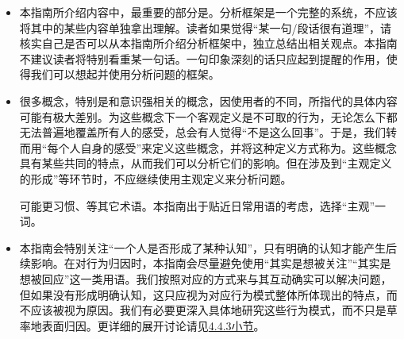 \begin{itemize}
\item 本指南所介绍内容中，最重要的部分是。分析框架是一个完整的系统，不应该将其中的某些内容单独拿出理解。读者如果觉得“某一句/段话很有道理”，请核实自己是否可以从本指南所介绍分析框架中，独立总结出相关观点。本指南不建议读者将特别看重某一句话。一句印象深刻的话只应起到提醒的作用，使得我们可以想起并使用分析问题的框架。
\item 很多概念，特别是和意识强相关的概念，因使用者的不同，所指代的具体内容可能有极大差别。为这些概念下一个客观定义是不可取的行为，无论怎么下都无法普遍地覆盖所有人的感受，总会有人觉得“不是这么回事”。于是，我们转而用“每个人自身的感受”来定义这些概念，并将这种定义方式称为。这些概念具有某些共同的特点，从而我们可以分析它们的影响。但在涉及到“主观定义的形成”等环节时，不应继续使用主观定义来分析问题。
\begin{explain}
\trained 可能更习惯、等其它术语。本指南出于贴近日常用语的考虑，选择“主观”一词。
\end{explain}
\item 本指南会特别关注“一个人是否形成了某种认知”，只有明确的认知才能产生后续影响。在对行为归因时，本指南会尽量避免使用“其实是想被关注”“其实是想被回应”这一类用语。我们按照对应的方式来与其互动确实可以解决问题，但如果没有形成明确认知，这只应视为对应行为模式整体所体现出的特点，而不应该被视为原因。我们有必要更深入具体地研究这些行为模式，而不只是草率地表面归因。更详细的展开讨论请见\hyperref[sec:对竞争过程的解读]{4.4.3小节}。
\end{itemize}